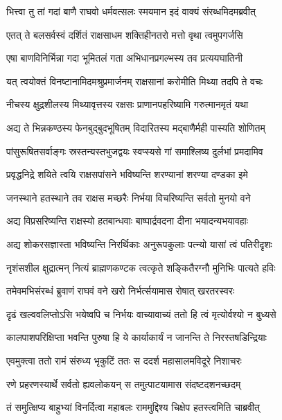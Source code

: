 
\twolineshloka
{भित्त्वा तु तां गदां बाणै राघवो धर्मवत्सलः}
{स्मयमान इदं वाक्यं संरब्धमिदमब्रवीत्} %

\twolineshloka
{एतत् ते बलसर्वस्वं दर्शितं राक्षसाधम}
{शक्तिहीनतरो मत्तो वृथा त्वमुपगर्जसि} %

\twolineshloka
{एषा बाणविनिर्भिन्ना गदा भूमितलं गता}
{अभिधानप्रगल्भस्य तव प्रत्ययघातिनी} %

\twolineshloka
{यत् त्वयोक्तं विनष्टानामिदमश्रुप्रमार्जनम्}
{राक्षसानां करोमीति मिथ्या तदपि ते वचः} %

\twolineshloka
{नीचस्य क्षुद्रशीलस्य मिथ्यावृत्तस्य रक्षसः}
{प्राणानपहरिष्यामि गरुत्मानमृतं यथा} %

\twolineshloka
{अद्य ते भिन्नकण्ठस्य फेनबुद्बुदभूषितम्}
{विदारितस्य मद्बाणैर्मही पास्यति शोणितम्} %

\twolineshloka
{पांसुरूषितसर्वाङ्गः स्रस्तन्यस्तभुजद्वयः}
{स्वप्स्यसे गां समाश्लिष्य दुर्लभां प्रमदामिव} %

\twolineshloka
{प्रवृद्धनिद्रे शयिते त्वयि राक्षसपांसने}
{भविष्यन्ति शरण्यानां शरण्या दण्डका इमे} %

\twolineshloka
{जनस्थाने हतस्थाने तव राक्षस मच्छरैः}
{निर्भया विचरिष्यन्ति सर्वतो मुनयो वने} %

\twolineshloka
{अद्य विप्रसरिष्यन्ति राक्षस्यो हतबान्धवाः}
{बाष्पार्द्रवदना दीना भयादन्यभयावहाः} %

\twolineshloka
{अद्य शोकरसज्ञास्ता भविष्यन्ति निरर्थिकाः}
{अनुरूपकुलाः पत्न्यो यासां त्वं पतिरीदृशः} %

\twolineshloka
{नृशंसशील क्षुद्रात्मन् नित्यं ब्राह्मणकण्टक}
{त्वत्कृते शङ्कितैरग्नौ मुनिभिः पात्यते हविः} %

\twolineshloka
{तमेवमभिसंरब्धं ब्रुवाणं राघवं वने}
{खरो निर्भर्त्सयामास रोषात् खरतरस्वरः} %

\twolineshloka
{दृढं खल्ववलिप्तोऽसि भयेष्वपि च निर्भयः}
{वाच्यावाच्यं ततो हि त्वं मृत्योर्वश्यो न बुध्यसे} %

\twolineshloka
{कालपाशपरिक्षिप्ता भवन्ति पुरुषा हि ये}
{कार्याकार्यं न जानन्ति ते निरस्तषडिन्द्रियाः} %

\twolineshloka
{एवमुक्त्वा ततो रामं संरुध्य भृकुटिं ततः}
{स ददर्श महासालमविदूरे निशाचरः} %

\twolineshloka
{रणे प्रहरणस्यार्थे सर्वतो ह्यवलोकयन्}
{स तमुत्पाटयामास संदष्टदशनच्छदम्} %

\twolineshloka
{तं समुत्क्षिप्य बाहुभ्यां विनर्दित्वा महाबलः}
{राममुद्दिश्य चिक्षेप हतस्त्वमिति चाब्रवीत्} %

